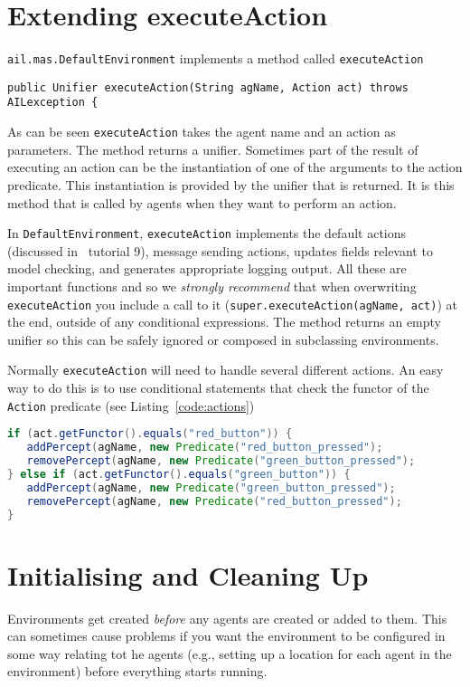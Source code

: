 \documentclass[a4]{article}
\begin{document}
\section{Extending executeAction}
\texttt{ail.mas.DefaultEnvironment} implements a method called \texttt{executeAction}

\begin{verbatim}
public Unifier executeAction(String agName, Action act) throws AILexception {
\end{verbatim}

As can be seen \texttt{executeAction} takes the agent name and an action as parameters.  The method returns a unifier.  Sometimes part of the result of executing an action can be the instantiation of one of the arguments to the action predicate.  This instantiation is provided by the unifier that is returned.  It is this method that is called by agents when they want to perform an action.

In \texttt{DefaultEnvironment}, \texttt{executeAction} implements the default actions (discussed in \gwendolen\ tutorial 9), message sending actions, updates fields relevant to model checking, and generates appropriate logging output.   All these are important functions and so we \emph{strongly recommend} that when overwriting \texttt{executeAction} you include a call to it (\texttt{super.executeAction(agName, act)}) at the end, outside of any conditional expressions.  The method returns an empty unifier so this can be safely ignored or composed in subclassing environments.

Normally \texttt{executeAction} will need to handle several different actions.  An easy way to do this is to use conditional statements that check the functor of the \texttt{Action} predicate (see Listing~\ref{code:actions})

\begin{lstlisting}[float,caption=Sample Action Handling Code,basicstyle=\sffamily,language=Java,style=easslisting,label=code:actions]
if (act.getFunctor().equals("red_button")) {
   addPercept(agName, new Predicate("red_button_pressed");
   removePercept(agName, new Predicate("green_button_pressed");
} else if (act.getFunctor().equals("green_button")) {
   addPercept(agName, new Predicate("green_button_pressed");
   removePercept(agName, new Predicate("red_button_pressed");
}
\end{lstlisting}

\section{Initialising and Cleaning Up}
Environments get created \emph{before} any agents are created or added to them.  This can sometimes cause problems if you want the environment to be configured in some way relating tot he agents (e.g., setting up a location for each agent in the environment) before everything starts running.
\end{document}
